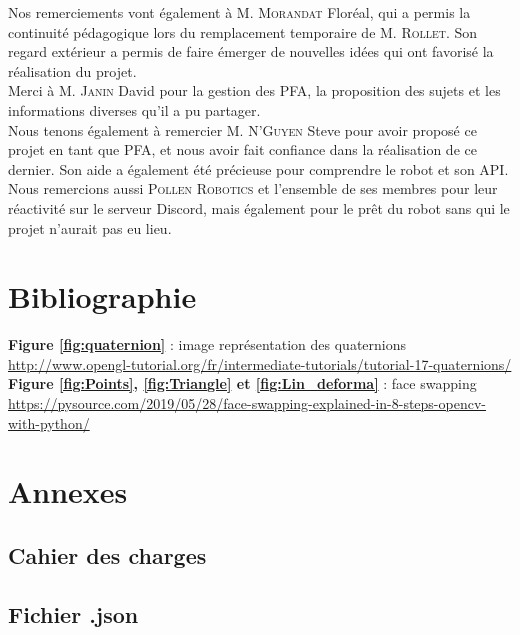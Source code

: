 \documentclass[a4paper,french]{article}
\begin{document}
Nos remerciements vont également à M. \textsc{Morandat} Floréal, qui a permis la continuité pédagogique lors du remplacement temporaire de M. \textsc{Rollet}. Son regard extérieur a permis de faire émerger de nouvelles idées qui ont favorisé la réalisation du projet. \\

Merci à M. \textsc{Janin} David pour la gestion des PFA, la proposition des sujets et les informations diverses qu'il a pu partager. \\

Nous tenons également à remercier M. \textsc{N'Guyen} Steve pour avoir proposé ce projet en tant que PFA, et nous avoir fait confiance dans la réalisation de ce dernier. Son aide a également été précieuse pour comprendre le robot et son API. \\

Nous remercions aussi \textsc{Pollen Robotics} et l'ensemble de ses membres pour leur réactivité sur le serveur Discord, mais également pour le prêt du robot sans qui le projet n'aurait pas eu lieu.

\newpage
\section*{Bibliographie}
\textbf{Figure \ref{fig:quaternion}} : image représentation des quaternions\\
\url{http://www.opengl-tutorial.org/fr/intermediate-tutorials/tutorial-17-quaternions/}
\\

\textbf{Figure \ref{fig:Points}, \ref{fig:Triangle} et \ref{fig:Lin_deforma}} : face swapping \\
\url{https://pysource.com/2019/05/28/face-swapping-explained-in-8-steps-opencv-with-python/}



\label{RealLastPage}
\newpage
\thispagestyle{fancy}
\fancyfoot[R]{}
\section{Annexes}
\subsection{Cahier des charges}


\subsection{Fichier .json} \label{subsec:annexe_json}
\end{document}
